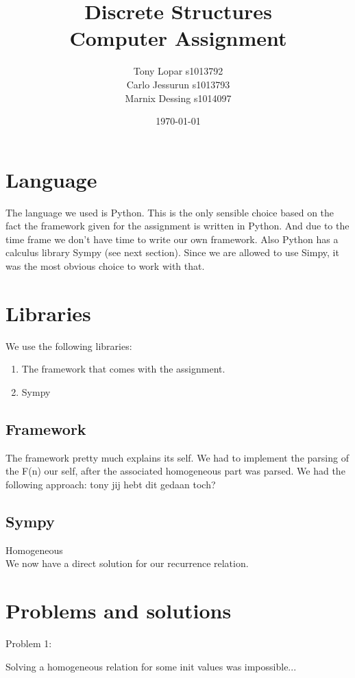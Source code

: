 \documentclass{article}
\begin{document}
\title{Discrete Structures \\ Computer Assignment}
\date{\today}
\author{Tony Lopar s1013792 \\ Carlo Jessurun s1013793 \\ Marnix Dessing s1014097}
\maketitle

\section{Language}
The language we used is Python. This is the only sensible choice based on the fact the framework given for the assignment is written in Python. And due to the time frame we don't have time to write our own framework. Also Python has a calculus library Sympy (see next section). Since we are allowed to use Simpy, it was the most obvious choice to work with that.

\section{Libraries}
We use the following libraries:
\begin{enumerate}
    \item The framework that comes with the assignment.
    \item Sympy
\end{enumerate}

\subsection{Framework}
The framework pretty much explains its self.
We had to implement the parsing of the F(n) our self, after the associated homogeneous part was parsed. We had the following approach: tony jij hebt dit gedaan toch?

\subsection{Sympy}
Homogeneous\\

We now have a direct solution for our recurrence relation.

\section{Problems and solutions}
Problem 1:

Solving a homogeneous relation for some init values was impossible...
\end{document}

